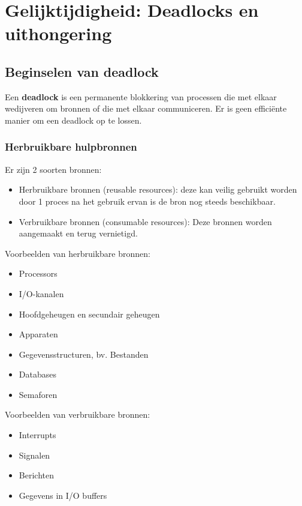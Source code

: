 \section{Gelijktijdigheid: Deadlocks en uithongering}

\subsection{Beginselen van deadlock}

Een \textbf{deadlock} is een permanente blokkering van processen die met elkaar wedijveren om bronnen of die met elkaar communiceren. Er is geen efficiënte manier om een deadlock op te lossen.

\subsubsection{Herbruikbare hulpbronnen}

Er zijn 2 soorten bronnen:

\begin{itemize}
\item Herbruikbare bronnen (reusable resources): deze kan veilig gebruikt worden door 1 proces na het gebruik ervan is de bron nog steeds beschikbaar.
\item Verbruikbare bronnen (consumable resources): Deze bronnen worden aangemaakt en terug vernietigd.
\end{itemize}

Voorbeelden van herbruikbare bronnen:

\begin{itemize}
\item Processors
\item I/O-kanalen
\item Hoofdgeheugen en secundair geheugen
\item Apparaten
\item Gegevensstructuren, bv. Bestanden
\item Databases
\item Semaforen
\end{itemize}

Voorbeelden van verbruikbare bronnen:

\begin{itemize}
\item Interrupts
\item Signalen
\item Berichten
\item Gegevens in I/O buffers
\end{itemize}

